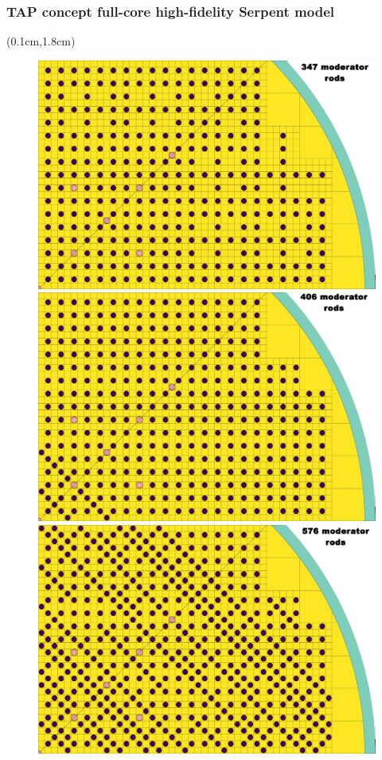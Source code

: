 \begin{frame}
\frametitle{\gls{TAP} concept full-core high-fidelity Serpent model}
\begin{textblock*}{12.6cm}(0.1cm,1.8cm) %
\begin{figure}[htp!] %
	\begin{overprint}
		\centerline{\includegraphics[height=0.75\textheight]{./images/347_base.png}}
		\centerline{\includegraphics[height=0.75\textheight]{./images/406.png}}
		\centerline{\includegraphics[height=0.75\textheight]{./images/576.png}}

\end{overprint}
\end{figure}
\end{textblock*}
\end{frame}
